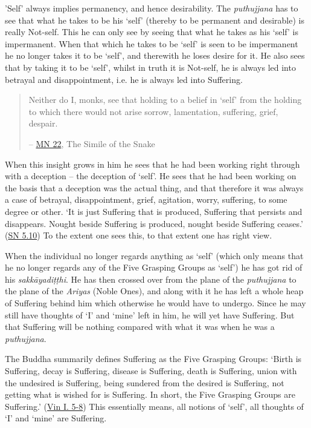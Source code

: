 \protect\hypertarget{impermanent}{}{}'Self' always implies permanency, and hence desirability. The \emph{puthujjana} has to see that what he takes to be his `self' (thereby to be permanent and desirable) is really Not-self. This he can only see by seeing that what he takes as his `self' is impermanent. When that which he takes to be `self' is seen to be impermanent he no longer takes it to be `self', and therewith he loses desire for it. He also sees that by taking it to be `self', whilst in truth it is Not-self, he is always led into betrayal and disappointment, i.e. he is always led into Suffering.

\enlargethispage{\baselineskip}

\begin{quote}
Neither do I, monks, see that holding to a belief in `self' from the holding to which there would not arise sorrow, lamentation, suffering, grief, despair.

 -- \href{https://suttacentral.net/mn22/en/bodhi}{MN 22}, The Simile of the Snake
\end{quote}

When this insight grows in him he sees that he had been working right through with a deception -- the deception of `self'. He sees that he had been working on the basis that a deception was the actual thing, and that therefore it was always a case of betrayal, disappointment, grief, agitation, worry, suffering, to some degree or other. `It is just Suffering that is produced, Suffering that persists and disappears. Nought beside Suffering is produced, nought beside Suffering ceases.' (\href{https://suttacentral.net/sn5.10/en/bodhi}{SN 5.10}) To the extent one sees this, to that extent one has right view.

When the individual no longer regards anything as `self' (which only means that he no longer regards any of the Five Grasping Groups as `self') he has got rid of his \emph{sakkāyadiṭṭhi}. He has then crossed over from the plane of the \emph{puthujjana} to the plane of the \emph{Ariyas} (Noble Ones), and along with it he has left a whole heap of Suffering behind him which otherwise he would have to undergo. Since he may still have thoughts of `I' and `mine' left in him, he will yet have Suffering. But that Suffering will be nothing compared with what it was when he was a \emph{puthujjana}.

The Buddha summarily defines Suffering as the Five Grasping Groups: `Birth is Suffering, decay is Suffering, disease is Suffering, death is Suffering, union with the undesired is Suffering, being sundered from the desired is Suffering, not getting what is wished for is Suffering. In short, the Five Grasping Groups are Suffering.' (\href{https://suttacentral.net/pli-tv-kd1/en/brahmali}{Vin I. 5-8}) This essentially means, all notions of `self', all thoughts of `I' and `mine' are Suffering.

